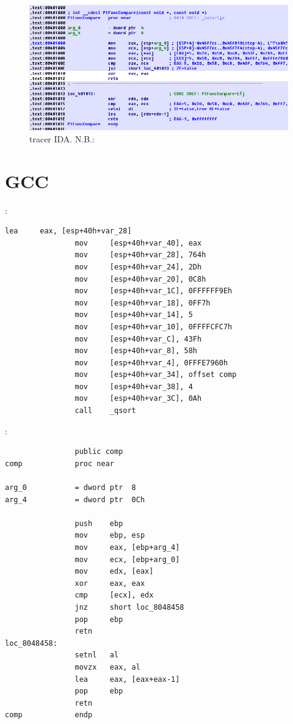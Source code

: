 \begin{figure}[H]
\centering
\includegraphics[scale=\FigScale]{patterns/18_pointers_to_functions/tracer_cc.png}
\caption{tracer \AndENRU IDA. N.B.: 
}
\label{fig:qsort_tracer_cc}
\end{figure}
\fi

\section{GCC}

:

\begin{lstlisting}[caption=GCC]
                lea     eax, [esp+40h+var_28]
                mov     [esp+40h+var_40], eax
                mov     [esp+40h+var_28], 764h
                mov     [esp+40h+var_24], 2Dh
                mov     [esp+40h+var_20], 0C8h
                mov     [esp+40h+var_1C], 0FFFFFF9Eh
                mov     [esp+40h+var_18], 0FF7h
                mov     [esp+40h+var_14], 5
                mov     [esp+40h+var_10], 0FFFFCFC7h
                mov     [esp+40h+var_C], 43Fh
                mov     [esp+40h+var_8], 58h
                mov     [esp+40h+var_4], 0FFFE7960h
                mov     [esp+40h+var_34], offset comp
                mov     [esp+40h+var_38], 4
                mov     [esp+40h+var_3C], 0Ah
                call    _qsort
\end{lstlisting}

:

\begin{lstlisting}
                public comp
comp            proc near

arg_0           = dword ptr  8
arg_4           = dword ptr  0Ch

                push    ebp
                mov     ebp, esp
                mov     eax, [ebp+arg_4]
                mov     ecx, [ebp+arg_0]
                mov     edx, [eax]
                xor     eax, eax
                cmp     [ecx], edx
                jnz     short loc_8048458
                pop     ebp
                retn
loc_8048458:
                setnl   al
                movzx   eax, al
                lea     eax, [eax+eax-1]
                pop     ebp
                retn
comp            endp
\end{lstlisting}

